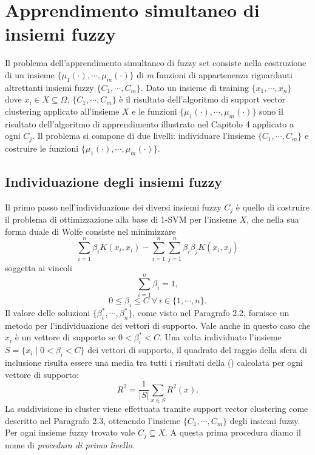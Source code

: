 \documentclass [11pt,a4paper,twoside,openright] {book}
\begin{document}
\chapter{Apprendimento simultaneo di insiemi fuzzy}
Il problema dell'apprendimento simultaneo di fuzzy set\cite{WIRN2018} consiste nella costruzione di un insieme $\lbrace \mu_1(\cdot), \cdots, \mu_m(\cdot) \rbrace$ di \textit{m} funzioni di appartenenza riguardanti altrettanti insiemi fuzzy $\lbrace C_1, \cdots, C_m \rbrace$. Dato un insieme di training $\lbrace x_1, \cdots, x_n \rbrace$ dove $ x_i \in X \subseteq \Omega$, $\lbrace C_1, \cdots, C_m \rbrace$ è il risultato dell'algoritmo di support vector clustering applicato all'insieme $X$ e le funzioni $\lbrace \mu_1(\cdot), \cdots, \mu_m(\cdot) \rbrace$ sono il risultato dell'algoritmo di apprendimento illustrato nel Capitolo 4 applicato a ogni $C_j$. Il problema si compone di due livelli: individuare l'insieme $\lbrace C_1, \cdots, C_m \rbrace$ e costruire le funzioni $\lbrace \mu_1(\cdot), \cdots, \mu_m(\cdot) \rbrace$.
\section{Individuazione degli insiemi fuzzy}
Il primo passo nell'individuazione dei diversi insiemi fuzzy $C_j$ è quello di costruire il problema di ottimizzazione alla base di 1-SVM per l'insieme $X$, che nella sua forma duale di Wolfe consiste nel minimizzare
\begin{equation}\label{wolfegurobi}
\sum_{i=1}^n\beta_iK(x_i,x_i) - \sum_{i=1}^n\sum_{j=1}^n\beta_i\beta_jK(x_i,x_j) 
\end{equation}
soggetta ai vincoli
\begin{equation}\label{uno}
\sum_{i=1}^n \beta_i = 1,
\end{equation}
\begin{equation}
0 \leq \beta_i \leq C \; \forall \: i \in \lbrace 1, \cdots, n\rbrace.
\end{equation}
Il valore delle soluzioni $\lbrace \beta_i^*, \cdots, \beta_n^* \rbrace$, come visto nel Paragrafo 2.2, fornisce un metodo per l'individuazione dei vettori di supporto. Vale anche in questo caso che $x_i$ è un vettore di supporto se  $0 < \beta_i^* < C.$
Una volta individuato l'insieme $S = \lbrace x_i \; | \; 0 < \beta_i < C \rbrace$ dei vettori di supporto, il quadrato del raggio della sfera di inclusione risulta essere una media tra tutti i risultati della () calcolata per ogni vettore di supporto:
\begin{equation}
R^2 = \dfrac{1}{|S|}\sum_{x \in S} R^2(x).
\end{equation}
La suddivisione in cluster viene effettuata tramite support vector clustering come descritto nel Paragrafo 2.3, ottenendo l'insieme $\lbrace C_1, \cdots, C_m \rbrace$ degli insiemi fuzzy. Per ogni insieme fuzzy trovato vale $C_j \subseteq X$. A questa prima procedura diamo il nome di \textit{procedura di primo livello}.
\end{document}
